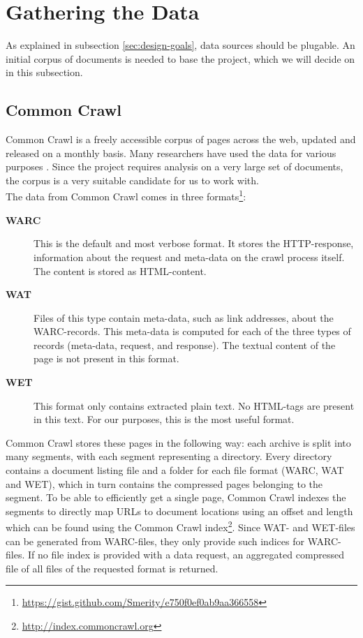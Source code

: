 \section{Gathering the Data}
As explained in subsection \ref{sec:design-goals}, data sources should be plugable. An initial corpus of documents is needed to base the project, which we will decide on in this subsection. 

\subsection{Common Crawl} \label{sec:commoncrawl}
Common Crawl \cite{commoncrawl} is a freely accessible corpus of pages across the web, updated and released on a monthly basis. Many researchers have used the data for various purposes
\cite{smith2013dirt, muhleisen2012web, singh2012wikilinks}.
Since the project requires analysis on a very large set of documents, the corpus is a very suitable candidate for us to work with. \\

The data from Common Crawl comes in three formats\footnote{\url{https://gist.github.com/Smerity/e750f0ef0ab9aa366558}}: 
\begin{description}
\item[\textbf{WARC}] This is the default and most verbose format. It stores the HTTP-response, information about the request and meta-data on the crawl process itself. The content is stored as HTML-content.
\item[\textbf{WAT}] Files of this type contain meta-data, such as link addresses, about the WARC-records. This meta-data is computed for each of the three types of records (meta-data, request, and response). The textual content of the page is not present in this format.
\item[\textbf{WET}] This format only contains extracted plain text. No HTML-tags are present in this text. For our purposes, this is the most useful format.
\end{description}

Common Crawl stores these pages in the following way: each archive is split into many segments, with each segment representing a directory. Every directory contains a document listing file and a folder for each file format (WARC, WAT and WET), which in turn contains the compressed pages belonging to the segment. To be able to efficiently get a single page, Common Crawl indexes the segments to directly map URLs to document locations using an offset and length which can be found using the Common Crawl index\footnote{\url{http://index.commoncrawl.org}}. Since WAT- and WET-files can be generated from WARC-files, they only provide such indices for WARC-files. If no file index is provided with a data request, an aggregated compressed file of all files of the requested format is returned.

